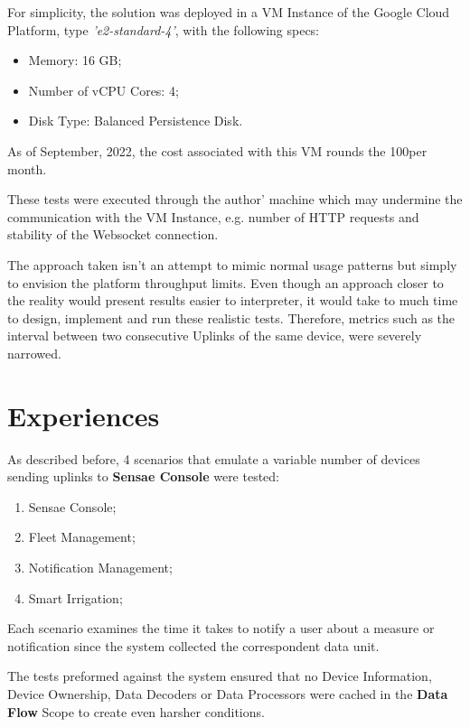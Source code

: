 For simplicity, the solution was deployed in a \gls{VM} Instance of the Google Cloud Platform, type \textit{'e2-standard-4'}, with the following specs:

\begin{itemize}
    \item Memory: 16 GB;
    \item Number of vCPU Cores: 4;
    \item Disk Type: Balanced Persistence Disk.
\end{itemize}

As of September, 2022, the cost associated with this \gls{VM} rounds the 100\texteuro per month.

These tests were executed through the author' machine which may undermine the communication with the \gls{VM} Instance, e.g. number of HTTP requests and stability of the Websocket connection.

The approach taken isn't an attempt to mimic normal usage patterns but simply to envision the platform throughput limits. Even though an approach closer to the reality would present results easier to interpreter, it would take to much time to design, implement and run these realistic tests. Therefore, metrics such as the interval between two consecutive Uplinks of the same device, were severely narrowed.

\section{Experiences}
\label{sec:evaluation:experiences}

As described before, 4 scenarios that emulate a variable number of devices sending uplinks to \textbf{Sensae Console} were tested:

\begin{enumerate}
    \item Sensae Console;
    \item Fleet Management;
    \item Notification Management;
    \item Smart Irrigation;
\end{enumerate}

Each scenario examines the time it takes to notify a user about a measure or notification since the system collected the correspondent data unit.

The tests preformed against the system ensured that no Device Information, Device Ownership, Data Decoders or Data Processors were cached in the \textbf{Data Flow} Scope to create even harsher conditions.

